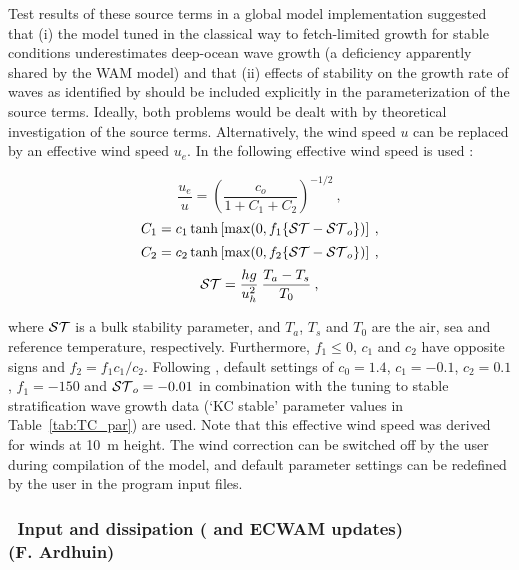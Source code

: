 Test results of these source terms in a global model implementation
\citep{tol:OMB02a} suggested that (i) the model tuned in the classical way to
fetch-limited growth for stable conditions underestimates deep-ocean wave
growth (a deficiency apparently shared by the WAM model) and that (ii) effects
of stability on the growth rate of waves as identified by
\cite{art:KC92,ibk:KC94} should be included explicitly in the parameterization
of the source terms.  Ideally, both problems would be dealt with by
theoretical investigation of the source terms. Alternatively, the wind speed
$u$ can be replaced by an effective wind speed $u_e$. In \cite{tol:OMB02a} the
following effective wind speed is used :


\begin{equation}
\frac{u_e}{u} = \left ( \frac{c_o}{1 + C_1 + C_2} \right )^{-1/2}
\: , \label{eq:scor} \end{equation} \begin{equation}
C_1 = c_1 \tanh \left [ \max ( 0 , f_1 \{ {\cal ST} - {\cal ST}_o \} ) \right ]
\: , \label{eq:c1} \end{equation} \begin{equation}
C_2 = c_2 \tanh \left [ \max ( 0 , f_2 \{ {\cal ST} - {\cal ST}_o \} ) \right ]
\: , \label{eq:c2} \end{equation} \begin{equation}
{\cal ST} = \frac{h g}{u_h^2} \: \frac{T_a - T_s}{T_0}
\: , \label{eq:stab} \end{equation}

\noindent
where ${\cal ST}$ is a bulk stability parameter, and $T_a$, $T_s$ and $T_0$ are the
air, sea and reference temperature, respectively. Furthermore, $f_1 \leq 0$,
$c_1$ and $c_2$ have opposite signs and $f_2 = f_1 c_1 / c_2$. Following
\cite{tol:OMB02a}, default settings of $c_0 = 1.4$, $c_1 = -0.1$, $c_2 = 0.1$,
$f_1 = -150$ and ${\cal ST}_o = -0.01$ in combination with the tuning to stable
stratification wave growth data (`KC stable' parameter values in
Table~\ref{tab:TC_par}) are used. Note that this effective wind speed was
derived for winds at 10~m height. The wind correction can be switched off by
the user during compilation of the model, and default parameter settings can
be redefined by the user in the program input files.

\vsssub
\subsubsection{~Input and dissipation ( and ECWAM updates) \\
\hfill {\rm (F. Ardhuin)}} \label{sec:wam4}
\vsssub

